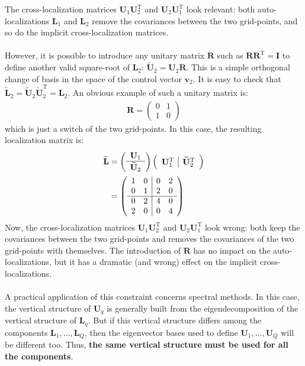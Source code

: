 \documentclass[12pt]{scrartcl}
\begin{document}
The cross-localization matrices $\mathbf{U}_1 \mathbf{U}_2^\mathrm{T}$ and $\mathbf{U}_2 \mathbf{U}_1^\mathrm{T}$ look relevant: both auto-localizations $\mathbf{L}_1$ and $\mathbf{L}_2$ remove the covariances between the two grid-points, and so do the implicit cross-localization matrices.\\
$  $\\
However, it is possible to introduce any unitary matrix $\mathbf{R}$ such as $\mathbf{R} \mathbf{R}^\mathrm{T} = \mathbf{I}$ to define another valid square-root of $\mathbf{L}_2$: $\widetilde{\mathbf{U}}_2 = \mathbf{U}_2 \mathbf{R}$. This is a simple orthogonal change of basis in the space of the control vector $\mathbf{v}_2$. It is easy to check that $\widetilde{\mathbf{L}}_2 = \widetilde{\mathbf{U}}_2 \widetilde{\mathbf{U}}_2^\mathrm{T} = \mathbf{L}_2$. An obvious example of such a unitary matrix is:
\begin{align}
\mathbf{R} = \left( \begin{array}{cc}
0 & 1 \\
1 & 0
\end{array} \right) 
\end{align}
which is just a switch of the two grid-points. In this case, the resulting localization matrix is:
\begin{align}
\widetilde{\mathbf{L}} & = \left( \begin{array}{c}
\mathbf{U}_1 \\
\hline \\[-0.4cm]
\widetilde{\mathbf{U}}_2
\end{array} \right) \left( \begin{array}{c|c}
\mathbf{U}_1^\mathrm{T} & \widetilde{\mathbf{U}}_2^\mathrm{T}
\end{array} \right) \nonumber \\
& = \left( \begin{array}{cc|cc}
1 & 0 & 0 & 2 \\
0 & 1 & 2 & 0 \\
\hline
0 & 2 & 4 & 0 \\
2 & 0 & 0 & 4
\end{array} \right) 
\end{align}
Now, the cross-localization matrices $\mathbf{U}_1 \mathbf{U}_2^\mathrm{T}$ and $\mathbf{U}_2 \mathbf{U}_1^\mathrm{T}$ look wrong: both keep the covariances between the two grid-points and removes the covariances of the two grid-points with themselves. The introduction of $\mathbf{R}$ has no impact on the auto-localizations, but it has a dramatic (and wrong) effect on the implicit cross-localizations.\\
$ $\\
A practical application of this constraint concerns spectral methods. In this case, the vertical structure of $\mathbf{U}_q$ is generally built from the eigendecomposition of the vertical structure of $\mathbf{L}_q$. But if this vertical structure differs among the components $\mathbf{L}_1, \dots, \mathbf{L}_Q$, then the eigenvector bases used to define $\mathbf{U}_1, \dots, \mathbf{U}_Q$ will be different too. Thus, \textbf{the same vertical structure must be used for all the components}.
\end{document}

